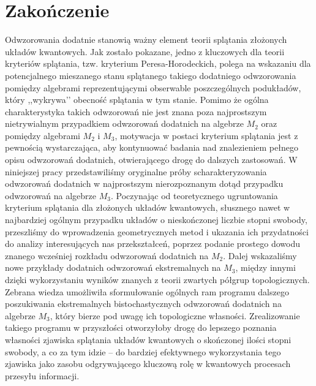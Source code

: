 \chapter{Zakończenie}
    \label{chap:Zakończenie}

Odwzorowania dodatnie stanowią ważny element teorii splątania złożonych
układów kwantowych.
Jak zostało pokazane, jedno z kluczowych dla teorii kryteriów splątania,
tzw. kryterium Peresa-Horodeckich,
polega na wskazaniu dla potencjalnego mieszanego stanu splątanego takiego
dodatniego odwzorowania pomiędzy algebrami reprezentującymi obserwable
poszczególnych podukładów, który ,,wykrywa’’ obecność splątania w tym stanie.
Pomimo że ogólna charakterystyka takich odwzorowań nie jest znana poza
najprostszym nietrywialnym przypadkiem odwzorowań dodatnich na algebrze
$M_{2}$ oraz pomiędzy algebrami $M_{2}$ i $M_{3}$, motywacja w postaci kryterium
splątania jest z pewnością wystarczająca,
aby kontynuować badania nad znalezieniem pełnego opisu odwzorowań dodatnich,
otwierającego drogę do dalszych zastosowań.
W niniejszej pracy przedstawiliśmy oryginalne próby scharakteryzowania
odwzorowań dodatnich w najprostszym nierozpoznanym dotąd przypadku odwzorowań
na algebrze $M_{3}$.
Poczynając od teoretycznego ugruntowania kryterium splątania dla złożonych
układów kwantowych,
słusznego nawet w najbardziej ogólnym przypadku układów
o nieskończonej liczbie stopni swobody,
przeszliśmy do wprowadzenia geometrycznych metod i ukazania ich przydatności do
analizy interesujących nas przekształceń,
poprzez podanie prostego dowodu znanego wcześniej rozkładu
odwzorowań dodatnich na $M_{2}$.
Dalej wskazaliśmy nowe przykłady dodatnich odwzorowań ekstremalnych na $M_{3}$,
między innymi dzięki wykorzystaniu wyników znanych
z teorii zwartych półgrup topologicznych.
Zebrana wiedza umożliwiła sformułowanie ogólnych ram programu dalszego
poszukiwania ekstremalnych bistochastycznych odwzorowań dodatnich
na algebrze $M_{3}$,
który bierze pod uwagę ich topologiczne własności.
Zrealizowanie takiego programu w przyszłości otworzyłoby drogę do lepszego
poznania własności zjawiska splątania układów kwantowych o skończonej ilości
stopni swobody,
a co za tym idzie -- do bardziej efektywnego wykorzystania tego zjawiska jako
zasobu odgrywającego kluczową rolę w kwantowych procesach przesyłu informacji.
